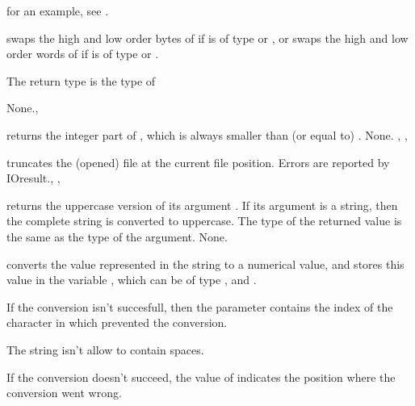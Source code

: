 \documentclass{report}
\begin{document}
for an example, see .

{ swaps the high and low order bytes of  if  is of
type  or , or swaps the high and low order words of
 if  is of type  or .

The return type is the type of }
{None.}{, }

\html{}

{ returns the integer part of , 
which is always smaller than (or equal to)  .}
{None.}
{, , }

\html{}

{ truncates the (opened) file  at the current file
position.
}{Errors are reported by IOresult.}{, ,
}

\html{}

{ returns the uppercase version of its argument .
If its argument is a string, then the complete string is converted to 
uppercase. The type of the returned value is the same as the type of the
argument.}
{None.}
{}

\html{}

{ converts the value represented in the string  to a numerical
value, and stores this value in the variable , which 
can be of type ,  and .

If the conversion isn't succesfull, then the parameter  contains
the index of the character in  which prevented the conversion.

The string  isn't allow to contain spaces.}
{If the conversion doesn't succeed, the value of  indicates the
position where the conversion went wrong.}
{}

\html{}
\end{document}
